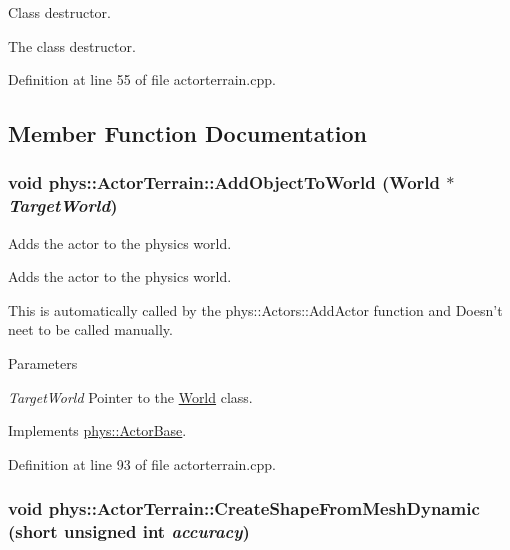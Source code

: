 Class destructor. 

The class destructor. 

Definition at line 55 of file actorterrain.cpp.



\subsection{Member Function Documentation}
\hypertarget{classphys_1_1ActorTerrain_a890ee6f67fda30381bce9c949ae36566}{
\subsubsection[{AddObjectToWorld}]{\setlength{\rightskip}{0pt plus 5cm}void phys::ActorTerrain::AddObjectToWorld ({\bf World} $\ast$ {\em TargetWorld})}}
\label{de/d74/classphys_1_1ActorTerrain_a890ee6f67fda30381bce9c949ae36566}


Adds the actor to the physics world. 

Adds the actor to the physics world. \par
 This is automatically called by the phys::Actors::AddActor function and Doesn't neet to be called manually. 
\begin{DoxyParams}{Parameters}
\item[{\em TargetWorld}]Pointer to the \hyperlink{classphys_1_1World}{World} class. \end{DoxyParams}


Implements \hyperlink{classphys_1_1ActorBase_a3d28e4c4a33f50210101695cb33ded3b}{phys::ActorBase}.



Definition at line 93 of file actorterrain.cpp.

\hypertarget{classphys_1_1ActorTerrain_aa5f545a73da45ab219121c4b2cd0ded9}{
\subsubsection[{CreateShapeFromMeshDynamic}]{\setlength{\rightskip}{0pt plus 5cm}void phys::ActorTerrain::CreateShapeFromMeshDynamic (short unsigned int {\em accuracy})}}
\label{de/d74/classphys_1_1ActorTerrain_aa5f545a73da45ab219121c4b2cd0ded9}


